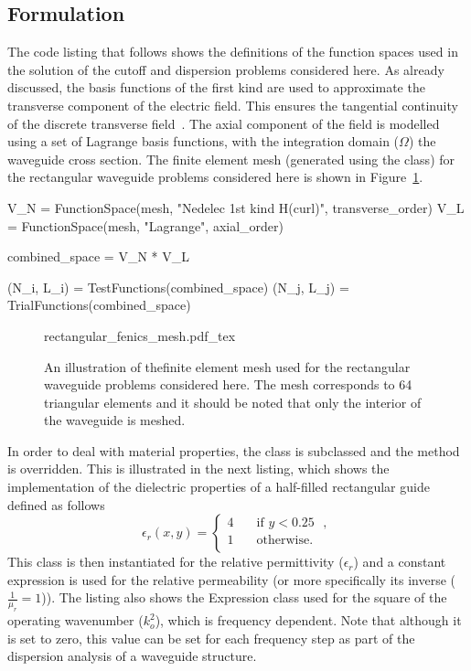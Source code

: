 \subsection{Formulation}

The code listing that follows shows the definitions of the function
spaces used in the solution of the cutoff and dispersion problems
considered here. As already discussed, the \nedelec{} basis functions of
the first kind are used to approximate the transverse component of the
electric field. This ensures the tangential continuity of the discrete
transverse field~\citep{Jin2002}.  The axial component of the field is
modelled using a set of Lagrange basis functions, with the integration
domain ($\Omega$) the waveguide cross section. The finite element mesh
(generated using the \dolfin{}  class) for the
rectangular waveguide problems considered here is shown in
Figure~\ref{fig:lezar:rectangular_fenics_mesh}.
\begin{python}
V_N = FunctionSpace(mesh, "Nedelec 1st kind H(curl)", transverse_order)
V_L = FunctionSpace(mesh, "Lagrange", axial_order)

combined_space = V_N * V_L

(N_i, L_i) = TestFunctions(combined_space)
(N_j, L_j) = TrialFunctions(combined_space)
\end{python}

\begin{figure}
  \centering
    \def\svgwidth{\smallfig}
  {rectangular_fenics_mesh.pdf_tex}
  \caption{An illustration of the\break finite element mesh used for the
  rectangular waveguide problems considered here. The mesh corresponds
  to 64 triangular elements and it should be noted that only the interior
  of the waveguide is meshed.}
  \label{fig:lezar:rectangular_fenics_mesh}
\end{figure}

In order to deal with material properties, the  class
is subclassed and the  method is overridden. This is illustrated
in the next listing, which shows the implementation of the dielectric
properties of a half-filled rectangular guide defined as follows
\begin{equation}
\label{eq:lezar:half_filled_dielectric}
\epsilon_r (x,y) =
\begin{cases}
  4\quad &\text{if $y < 0.25$ },\\
  1\quad &\text{otherwise}.\\
\end{cases}
\end{equation}
This class is then instantiated for the relative permittivity
($\epsilon_r$) and a constant expression is used for the relative
permeability (or more specifically its inverse ($\frac{1}{\mu_r}
= 1$)). The listing also shows the Expression class used for the
square of the operating wavenumber ($k_o^2$), which is frequency
dependent. Note that although it is set to zero, this value can
be set for each frequency step as part of the dispersion analysis of a
waveguide structure.

